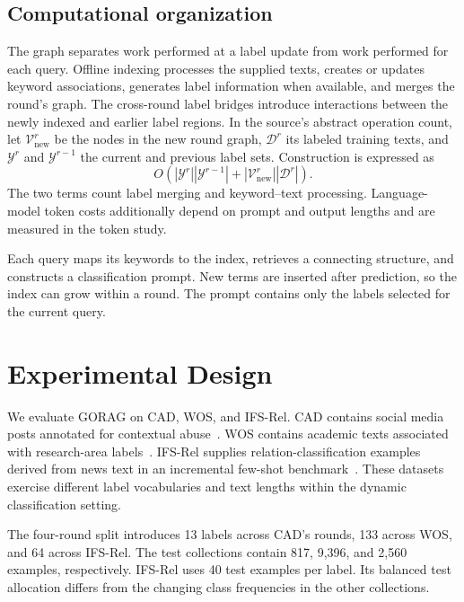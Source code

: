\subsection{Computational organization}
\label{sec:gorag:computation}

The graph separates work performed at a label update from work performed for each query. Offline indexing processes the supplied texts, creates or updates keyword associations, generates label information when available, and merges the round's graph. The cross-round label bridges introduce interactions between the newly indexed and earlier label regions. In the source's abstract operation count, let $\mathcal V_{\mathrm{new}}^r$ be the nodes in the new round graph, $\mathcal D^r$ its labeled training texts, and $\mathcal Y^r$ and $\mathcal Y^{r-1}$ the current and previous label sets. Construction is expressed as
\begin{equation}
O\!\left(|\mathcal{Y}^r||\mathcal{Y}^{r-1}|+|\mathcal{V}_{\mathrm{new}}^r||\mathcal{D}^r|\right).
\label{eq:gorag:constructioncost}
\end{equation}
The two terms count label merging and keyword--text processing. Language-model token costs additionally depend on prompt and output lengths and are measured in the token study.

Each query maps its keywords to the index, retrieves a connecting structure, and constructs a classification prompt. New terms are inserted after prediction, so the index can grow within a round. The prompt contains only the labels selected for the current query.

\section{Experimental Design}
\label{sec:gorag:experiments}

We evaluate GORAG on CAD, WOS, and IFS-Rel. CAD contains social media posts annotated for contextual abuse~\cite{gorag-vidgen2021introducing}. WOS contains academic texts associated with research-area labels~\cite{gorag-kowsari2017hdltex}. IFS-Rel supplies relation-classification examples derived from news text in an incremental few-shot benchmark~\cite{gorag-xia-etal-2021-incremental}. These datasets exercise different label vocabularies and text lengths within the dynamic classification setting.

The four-round split introduces 13 labels across CAD's rounds, 133 across WOS, and 64 across IFS-Rel. The test collections contain 817, 9,396, and 2,560 examples, respectively. IFS-Rel uses 40 test examples per label. Its balanced test allocation differs from the changing class frequencies in the other collections.

